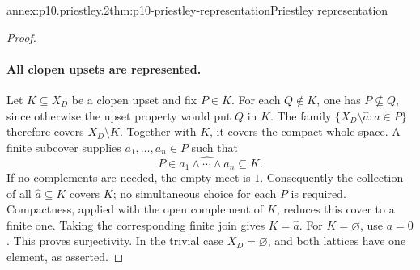 \begin{annexitem}{annex:p10.priestley.2}{thm:p10-priestley-representation}{Priestley representation}
\begin{proof}
\paragraph{All clopen upsets are represented.}
Let \(K\subseteq X_D\) be a clopen upset and fix \(P\in K\).
For each \(Q\notin K\), one has \(P\not\subseteq Q\), since
otherwise the upset property would put \(Q\) in \(K\).
The family
\(\{X_D\setminus\widehat a:a\in P\}\)
therefore covers \(X_D\setminus K\).
Together with \(K\), it covers the compact whole space.
A finite subcover supplies \(a_1,\ldots,a_n\in P\) such that
\[
 P\in\widehat{a_1\wedge\cdots\wedge a_n}\subseteq K.
\]
If no complements are needed, the empty meet is \(1\).
Consequently the collection of all \(\widehat a\subseteq K\)
covers \(K\); no simultaneous choice for each \(P\) is required.
Compactness, applied with the open complement of \(K\), reduces
this cover to a finite one.
Taking the corresponding finite join gives \(K=\widehat a\).
For \(K=\varnothing\), use \(a=0\).
This proves surjectivity.
In the trivial case \(X_D=\varnothing\), and both lattices have
one element, as asserted.
\end{proof}
\end{annexitem}

